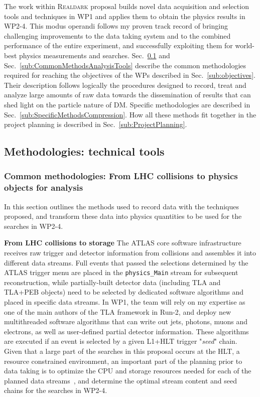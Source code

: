 The work within \textsc{Realdark} proposal builds novel data acquisition and selection tools and techniques in WP1 and applies them to obtain the physics results in WP2-4. This modus operandi follows my proven track record of bringing challenging improvements to the data taking system and to the combined performance of the entire experiment, and successfully exploiting them for world-best physics measurements and searches. 
Sec.~\ref{sub:CommonMethodsTechnicalTools} and Sec.~\ref{sub:CommonMethodsAnalysisTools} describe the common methodologies required for reaching the objectives of the WPs described in Sec.~\ref{sub:objectives}. 
Their description follows logically the procedures designed to record, treat and analyze large amounts of raw data towards the dissemination of results that can shed light on the particle nature of DM. Specific methodologies are described in Sec.~\ref{sub:SpecificMethodsCompression}. 
How all these methods fit together in the project planning is described in Sec.~\ref{sub:ProjectPlanning}.  

\subsection{Methodologies: technical tools}
\label{sub:CommonMethodsTechnicalTools}

\subsubsection{Common methodologies: From LHC collisions to physics objects for analysis}
\label{subsub:TriggerRecoSoftware}

In this section outlines the methods used to record data with the techniques proposed, 
and transform these data into physics quantities to be used for the searches in WP2-4. 

\textbf{From LHC collisions to storage} The ATLAS core software infrastructure receives raw trigger and detector information from collisions and assembles it into different data streams. 
Full events that passed the selections determined by the ATLAS trigger menu are placed in the \texttt{physics\_Main} stream for subsequent reconstruction, while partially-built detector data (including TLA and TLA+PEB objects) need to be selected by dedicated software algorithms and placed in specific data streams. 
In WP1, the team will rely on my expertise as one of the main authors of the TLA framework in Run-2, and deploy new multithreaded software algorithms that can write out jets, photons, muons and electrons, as well as user-defined partial detector information. 
These algorithms are executed if an event is selected by a given L1+HLT trigger "\textit{seed}" chain. 
Given that a large part of the searches in this proposal occurs at the HLT, a resource constrained environment, an important part of the planning prior to data taking is to optimize the CPU and storage resources needed for each of the planned data streams~\cite{ToBeCited}, %
and determine the optimal stream content and seed chains for the searches in WP2-4. 

